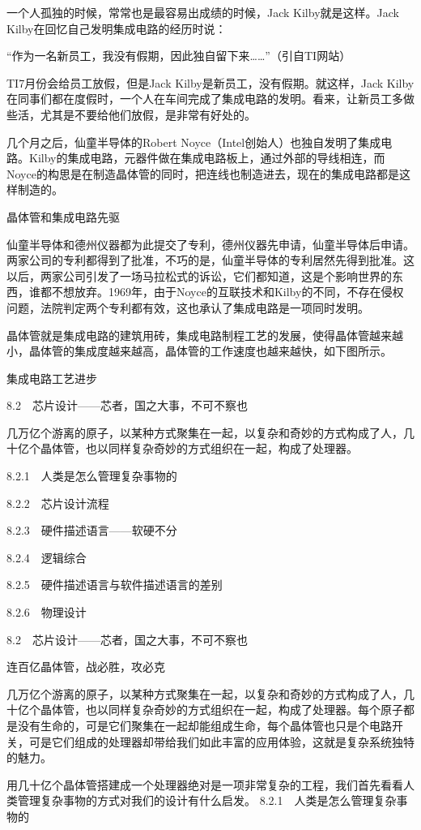 \documentclass[12pt,UTF8]{ctexbook}
\begin{document}
一个人孤独的时候，常常也是最容易出成绩的时候，Jack Kilby就是这样。Jack Kilby在回忆自己发明集成电路的经历时说：

“作为一名新员工，我没有假期，因此独自留下来……”（引自TI网站）

TI7月份会给员工放假，但是Jack Kilby是新员工，没有假期。就这样，Jack Kilby在同事们都在度假时，一个人在车间完成了集成电路的发明。看来，让新员工多做些活，尤其是不要给他们放假，是非常有好处的。

几个月之后，仙童半导体的Robert Noyce（Intel创始人）也独自发明了集成电路。Kilby的集成电路，元器件做在集成电路板上，通过外部的导线相连，而Noyce的构思是在制造晶体管的同时，把连线也制造进去，现在的集成电路都是这样制造的。

晶体管和集成电路先驱

仙童半导体和德州仪器都为此提交了专利，德州仪器先申请，仙童半导体后申请。两家公司的专利都得到了批准，不巧的是，仙童半导体的专利居然先得到批准。这以后，两家公司引发了一场马拉松式的诉讼，它们都知道，这是个影响世界的东西，谁都不想放弃。1969年，由于Noyce的互联技术和Kilby的不同，不存在侵权问题，法院判定两个专利都有效，这也承认了集成电路是一项同时发明。

晶体管就是集成电路的建筑用砖，集成电路制程工艺的发展，使得晶体管越来越小，晶体管的集成度越来越高，晶体管的工作速度也越来越快，如下图所示。

集成电路工艺进步


8.2　芯片设计——芯者，国之大事，不可不察也

几万亿个游离的原子，以某种方式聚集在一起，以复杂和奇妙的方式构成了人，几十亿个晶体管，也以同样复杂奇妙的方式组织在一起，构成了处理器。

8.2.1　人类是怎么管理复杂事物的

8.2.2　芯片设计流程

8.2.3　硬件描述语言——软硬不分

8.2.4　逻辑综合

8.2.5　硬件描述语言与软件描述语言的差别

8.2.6　物理设计


8.2　芯片设计——芯者，国之大事，不可不察也

连百亿晶体管，战必胜，攻必克

几万亿个游离的原子，以某种方式聚集在一起，以复杂和奇妙的方式构成了人，几十亿个晶体管，也以同样复杂奇妙的方式组织在一起，构成了处理器。每个原子都是没有生命的，可是它们聚集在一起却能组成生命，每个晶体管也只是个电路开关，可是它们组成的处理器却带给我们如此丰富的应用体验，这就是复杂系统独特的魅力。

用几十亿个晶体管搭建成一个处理器绝对是一项非常复杂的工程，我们首先看看人类管理复杂事物的方式对我们的设计有什么启发。
8.2.1　人类是怎么管理复杂事物的
\end{document}
